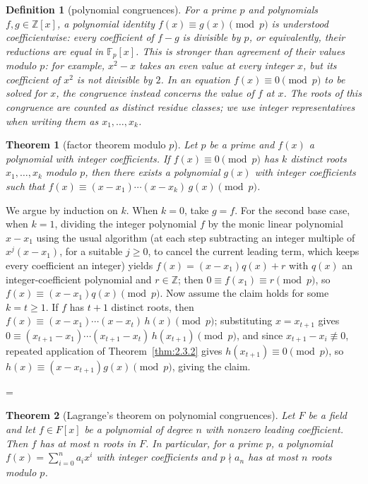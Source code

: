 \documentclass[11pt]{article}
\makeatletter
\theoremstyle{ntstyle}
\newtheorem{theorem}{Theorem}[subsection]
\newtheorem{definition}{Definition}[subsection]
\let\nt@closedisplay\]
\def\nt@guardedclose{\@ifnextchar\par{\nt@closeafterpar}{\@ifnextchar\end{\postdisplaypenalty\@M\nt@closedisplay}{\nt@closedisplay}}}
\def\nt@closeafterpar\par{\@ifnextchar\par{\nt@closeafterpar}{\@ifnextchar\end{\postdisplaypenalty\@M\nt@closedisplay\par}{\nt@closedisplay\par}}}
\renewenvironment{proof}[1][\proofname]{\par
  \pushQED{\qed}\normalfont\topsep\medskipamount\edef\nt@afterproof{\@endparpenalty=\the\@endparpenalty\relax}\@beginparpenalty\@M\@endparpenalty\@M\let\]\nt@guardedclose\trivlist\item[]\textit{#1\@addpunct{.}} \ignorespaces}{\ifvmode\addpenalty\@M\fi\popQED\nt@afterproof\endtrivlist\@endpefalse}
\makeatother
\begin{document}
\begin{definition}[polynomial congruences]\label{def:3.6.1}
	For a prime $p$ and polynomials $f,g\in\mathbb{Z}[x]$, a polynomial identity
	$f(x)\equiv g(x)\pmod{p}$ is understood coefficientwise: every coefficient
	of $f-g$ is divisible by $p$, or equivalently, their reductions are equal
	in $\mathbb{F}_p[x]$. This is stronger than agreement of their values
	modulo $p$: for example, $x^2-x$ takes an even value at every integer $x$, but its
	coefficient of $x^2$ is not divisible by $2$. In an equation
	$f(x)\equiv0\pmod p$ to be solved for $x$, the congruence instead concerns
	the value of $f$ at $x$. The roots of this congruence are counted as distinct residue classes;
	we use integer representatives when writing them as $x_1,\ldots,x_k$.

\end{definition}

\begin{theorem}[factor theorem modulo $p$]\label{thm:3.6.1} Let $p$ be a prime and $f(x)$ a
	polynomial with integer coefficients. If $f(x) \equiv 0 \pmod{p}$ has
	$k$ distinct roots $x_1, \ldots, x_k$ modulo $p$, then there exists a
	polynomial $g(x)$ with integer coefficients such that $f(x) \equiv (x
		- x_1) \cdots (x - x_k)\, g(x) \pmod{p}$.

\end{theorem}

\begin{proof} We argue by induction on $k$. When $k=0$,
	take $g=f$. For the second base case, when $k=1$, dividing the integer
	polynomial $f$ by the monic linear
	polynomial $x - x_1$ using the usual algorithm (at each step subtracting an integer multiple of $x^{j}(x - x_1)$, for a suitable $j \ge 0$, to cancel the current leading term, which keeps every coefficient an integer) yields
	$f(x) = (x - x_1) q(x) + r$ with $q(x)$ an integer-coefficient
	polynomial and $r \in \mathbb{Z}$; then $0 \equiv
		f(x_1) \equiv r \pmod{p}$, so $f(x) \equiv (x - x_1) q(x) \pmod{p}$.
	Now assume the claim holds for some $k = t\ge1$. If $f$ has $t+1$
	distinct roots, then $f(x) \equiv (x - x_1) \cdots (x - x_t)\, h(x)
		\pmod{p}$; substituting $x = x_{t+1}$ gives $0 \equiv (x_{t+1} - x_1)
		\cdots (x_{t+1} - x_t)\, h(x_{t+1}) \pmod{p}$, and since $x_{t+1} -
		x_i \not\equiv 0$, repeated application of Theorem~\ref{thm:2.3.2} gives $h(x_{t+1}) \equiv 0 \pmod{p}$, so
	$h(x) \equiv (x - x_{t+1}) g(x) \pmod{p}$, giving the claim.

\end{proof}
\begin{theorem}[Lagrange's theorem on polynomial congruences]\label{thm:3.6.2} Let $F$ be a
	field and let $f\in F[x]$ be a polynomial of degree $n$ with nonzero
	leading coefficient. Then $f$ has at most $n$ roots in $F$. In particular,
	for a prime $p$, a polynomial $f(x)=\sum_{i=0}^{n} a_i x^{i}$ with integer
	coefficients and $p \nmid a_n$ has at most $n$ roots modulo $p$.

\end{theorem}
\end{document}
